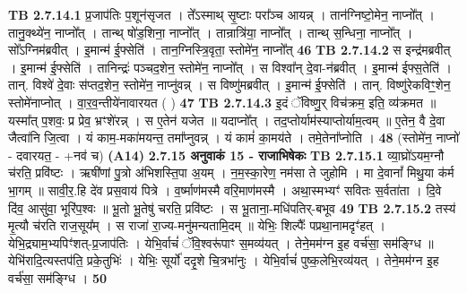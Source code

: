 \documentclass[17pt]{extarticle}
\begin{document}
{                                \textbf{ TB 2.7.14.1} \newline
                  प्र॒जाप॑तिः प॒शून॑सृजत । ते᳚ऽस्माथ् सृ॒ष्टाः परा᳚ञ्च आयन्न् । तान॑ग्निष्टो॒मेन॒ नाप्नो᳚त् । तानु॒क्थ्ये॑न॒ नाप्नो᳚त् । तान्थ् षो॑ड॒शिना॒ नाप्नो᳚त् । तान्रात्रि॑या॒ नाप्नो᳚त् । तान्थ् स॒न्धिना॒ नाप्नो᳚त् । सो᳚ऽग्निम॑ब्रवीत् । इ॒मान्म॑ ई॒फ्सेति॑ । तान॒ग्निस्त्रि॒वृता॒ स्तोमे॑न॒ नाप्नो᳚त् \textbf{ 46} \newline
                  \newline
                                \textbf{ TB 2.7.14.2} \newline
                  स इन्द्र॑मब्रवीत् । इ॒मान्म॑ ई॒फ्सेति॑ । तानिन्द्रः॑ पञ्चद॒शेन॒ स्तोमे॑न॒ नाप्नो᳚त् । स विश्वा᳚न् दे॒वा-न॑ब्रवीत् । इ॒मान्म॑ ईफ्स॒तेति॑ । तान्. विश्वे॑ दे॒वाः स॑प्तद॒शेन॒ स्तोमे॑न॒ नाप्नु॑वन्न् । स विष्णु॑मब्रवीत् । इ॒मान्म॑ ई॒फ्सेति॑ । तान्. विष्णु॑रेकविꣳ॒॒शेन॒ स्तोमे॑नाप्नोत् । वा॒र॒व॒न्तीये॑नावारयत ( ) \textbf{ 47} \newline
                  \newline
                                \textbf{ TB 2.7.14.3} \newline
                  इ॒दं ॅविष्णु॒र् विच॑क्रम॒ इति॒ व्य॑क्रमत ॥ यस्मा᳚त् प॒शवः॒ प्र प्रेव॒ भ्रꣳशे॑रन्न् । स ए॒तेन॑ यजेत ॥ यदाप्नो᳚त् । तद॒प्तोर्याम॑स्याप्तोर्याम॒त्वम् ॥ ए॒तेन॒ वै दे॒वा जैत्वा॑नि जि॒त्वा । यं काम॒-मका॑मयन्त॒ तमा᳚प्नुवन्न् । यं कामं॑ का॒मय॑ते । तमे॒तेना᳚प्नोति । \textbf{ 48} \newline
                  \newline
                                    (स्तोमे॑न॒ नाप्नो॑ - दवारयत॒ - +नव॑ च) \textbf{(A14)} \newline \newline
                \textbf{ 2.7.15     अनुवाकं   15 - राजाभिषेकः} \newline
                                \textbf{ TB 2.7.15.1} \newline
                  व्या॒घ्रो॑ऽयम॒ग्नौ च॑रति॒ प्रवि॑ष्टः । ऋषी॑णां पु॒त्रो अ॑भिशस्ति॒पा अ॒यम् । न॒म॒स्का॒रेण॒ नम॑सा ते जुहोमि । मा दे॒वानां᳚ मिथु॒या क॑र्म भा॒गम् ॥ सावी॒र॒.हि दे॑व प्रस॒वाय॑ पित्रे । व॒र्ष्माण॑मस्मै वरि॒माण॑मस्मै । अथा॒स्मभ्यꣳ॑ सवितः स॒र्वता॑ता । दि॒वे दि॑व॒ आसु॑वा॒ भूरि॑प॒श्वः ॥ भू॒तो भू॒तेषु॑ चरति॒ प्रवि॑ष्टः । स भू॒ताना॒-मधि॑पतिर्-बभूव \textbf{ 49} \newline
                  \newline
                                \textbf{ TB 2.7.15.2} \newline
                  तस्य॑ मृ॒त्यौ च॑रति राज॒सूय᳚म् । स राजा॑ रा॒ज्य-मनु॑मन्यतामि॒दम् ॥ येभिः॒ शिल्पैः᳚ पप्रथा॒नामदृꣳ॑हत् । येभि॒द्र्याम॒भ्यपिꣳ॑शत्-प्र॒जाप॑तिः । येभि॒र्वाचं॑ ॅवि॒श्वरू॑पाꣳ स॒मव्य॑यत् । तेने॒मम॑ग्न इ॒ह वर्च॑सा॒ सम॑ङ्ग्धि ॥ येभि॑रादि॒त्यस्तप॑ति॒ प्रके॒तुभिः॑ । येभिः॒ सूर्यो॑ ददृ॒शे चि॒त्रभा॑नुः । येभि॒र्वाचं॑ पुष्क॒लेभि॒रव्य॑यत् । तेने॒मम॑ग्न इ॒ह वर्च॑सा॒ सम॑ङ्ग्धि । \textbf{ 50} \newline
}
\end{document}
